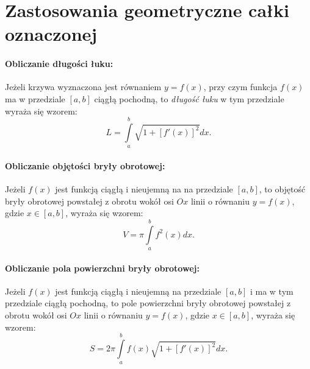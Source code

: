 \documentclass[a4paper,12pt]{book}
\begin{document}
     

\section*{Zastosowania geometryczne całki oznaczonej} 


\paragraph{Obliczanie długości łuku:}
Jeżeli krzywa wyznaczona jest równaniem $y = f(x)$, przy czym \mbox{funkcja}
$f(x)$ ma w przedziale $[a,b]$ ciągłą pochodną, to {\em długość łuku} w tym
przedziale wyraża się wzorem: $$L = \int\limits_a^b \sqrt{1 + [f'(x)]^2}dx.$$


\paragraph{Obliczanie objętości bryły obrotowej:}
Jeżeli $f(x)$ jest funkcją ciągłą i nieujemną na na przedziale $[a,b]$, to
objętość bryły obrotowej powstałej z obrotu wokół osi $Ox$ linii o równaniu
$y=f(x)$, gdzie $x \in [a,b]$, wyraża się wzorem:
$$V = \pi \int\limits_a^b  f^2(x)dx.$$


\paragraph{Obliczanie pola powierzchni bryły obrotowej:}
Jeżeli $f(x)$ jest funkcją ciągłą i nieujemną na przedziale $[a,b]$ i ma w
tym przedziale ciągłą pochodną, to pole powierzchni bryły obrotowej powstałej z
obrotu wokół osi $Ox$ linii o równaniu  $y=f(x)$, gdzie $x \in [a,b]$, wyraża się
wzorem:
$$S = 2\pi \int\limits_a^b f(x)\sqrt{1+[f'(x)]^2}dx.$$
\end{document}
